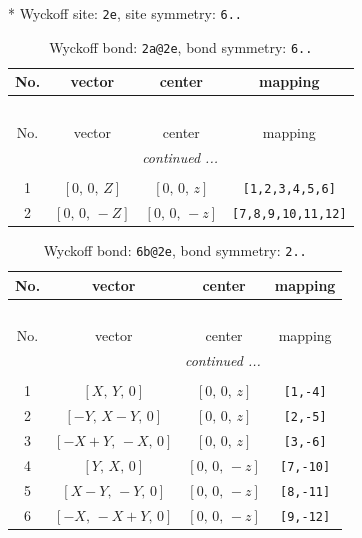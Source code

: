 \documentclass[fleqn,8pt]{jsarticle}
\begin{document}
* Wyckoff site: {\tt 2e}, site symmetry: {\tt 6..}
\renewcommand{\arraystretch}{1.2}
\begin{longtable}{cccc}
\caption{Wyckoff bond: {\tt 2a@2e}, bond symmetry: {\tt 6..}}
 \\
 \hline \hline
No. & vector & center & mapping \\ \hline \endfirsthead

\multicolumn{3}{l}{\tablename\ \thetable{}} \\
 \hline \hline
No. & vector & center & mapping \\ \hline \endhead

 \hline \hline
\multicolumn{3}{r}{\footnotesize\it continued ...} \\ \endfoot

 \hline \hline
\multicolumn{3}{r}{} \\ \endlastfoot

1 & $\left[ 0,\, 0,\, Z \right]$ & $\left[ 0,\, 0,\, z \right]$ & {\tt [1,2,3,4,5,6]} \\ \hline
2 & $\left[ 0,\, 0,\, - Z \right]$ & $\left[ 0,\, 0,\, - z \right]$ & {\tt [7,8,9,10,11,12]} \\
\end{longtable}
\renewcommand{\arraystretch}{1.2}
\begin{longtable}{cccc}
\caption{Wyckoff bond: {\tt 6b@2e}, bond symmetry: {\tt 2..}}
 \\
 \hline \hline
No. & vector & center & mapping \\ \hline \endfirsthead

\multicolumn{3}{l}{\tablename\ \thetable{}} \\
 \hline \hline
No. & vector & center & mapping \\ \hline \endhead

 \hline \hline
\multicolumn{3}{r}{\footnotesize\it continued ...} \\ \endfoot

 \hline \hline
\multicolumn{3}{r}{} \\ \endlastfoot

1 & $\left[ X,\, Y,\, 0 \right]$ & $\left[ 0,\, 0,\, z \right]$ & {\tt [1,-4]} \\ \hline
2 & $\left[ - Y,\, X - Y,\, 0 \right]$ & $\left[ 0,\, 0,\, z \right]$ & {\tt [2,-5]} \\ \hline
3 & $\left[ - X + Y,\, - X,\, 0 \right]$ & $\left[ 0,\, 0,\, z \right]$ & {\tt [3,-6]} \\ \hline
4 & $\left[ Y,\, X,\, 0 \right]$ & $\left[ 0,\, 0,\, - z \right]$ & {\tt [7,-10]} \\ \hline
5 & $\left[ X - Y,\, - Y,\, 0 \right]$ & $\left[ 0,\, 0,\, - z \right]$ & {\tt [8,-11]} \\ \hline
6 & $\left[ - X,\, - X + Y,\, 0 \right]$ & $\left[ 0,\, 0,\, - z \right]$ & {\tt [9,-12]} \\
\end{longtable}
\end{document}

